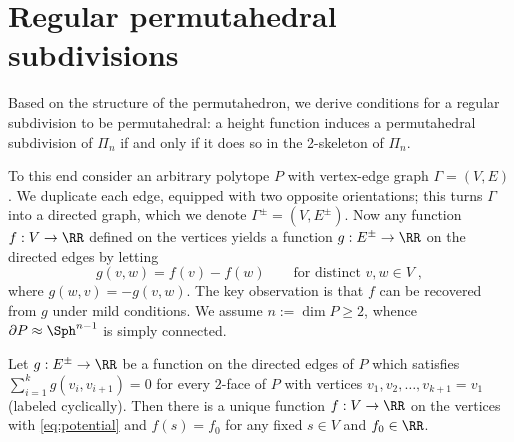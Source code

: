 \section{Regular permutahedral subdivisions}

Based on the structure of the permutahedron, we derive conditions for a regular subdivision to be permutahedral: 
a height function induces a permutahedral subdivision of $\Pi_n$ if and only if it does so in the 2-skeleton of $\Pi_n$.

To this end consider an arbitrary polytope $P$ with vertex-edge graph $\Gamma=(V,E)$.
We duplicate each edge, equipped with two opposite orientations; this turns $\Gamma$ into a directed graph, which we denote $\Gamma^\pm=(V,E^\pm)$.
Now any function $f:V\to\RR$ defined on the vertices yields a function $g:E^\pm\to\RR$ on the directed edges by letting
\begin{equation}\label{eq:potential}
  g(v,w) = f(v)-f(w) \qquad \text{for distinct } v,w\in V \; ,
\end{equation}
where $g(w,v)=-g(v,w)$.
The key observation is that $f$ can be recovered from $g$ under mild conditions.
We assume $n:=\dim P\geq 2$, whence $\partial P\approx\Sph^{n-1}$ is simply connected.
\begin{proposition}\label{prop:potential}
  Let $g:E^\pm\to\RR$ be a function on the directed edges of $P$ which satisfies $\sum_{i=1}^{k} g(v_i,v_{i+1})=0$ for every $2$-face of $P$ with vertices $v_1,v_2,\dots,v_{k+1}=v_1$ (labeled cyclically).
  Then there is a unique function $f:V\to\RR$ on the vertices with \eqref{eq:potential} and $f(s)=f_0$ for any fixed $s\in V$ and $f_0\in\RR$.
\end{proposition}
